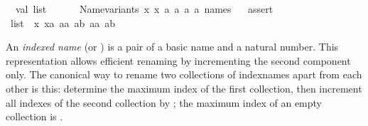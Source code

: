 \begin{isabellebody}
\isanewline
\ \ val\ list{}\ {}\isanewline
\ \ \ \ {}{}\ {}Name{}variants\ {}{}x{}{}\ {}x{}{}\ {}a{}{}\ {}a{}{}\ {}{}a{}{}\ {}{}a{}{}\ names{}{}\isanewline
\ \ %
\isaantiq
assert{}%
\endisaantiq
\ {}list{}\ {}\ {}{}x{}{}\ {}xa{}{}\ {}aa{}{}\ {}ab{}{}\ {}{}aa{}{}\ {}{}ab{}{}{}{}\isanewline
{}%
\endisatagML
{\isafoldML}%
%
\isadelimML
\isanewline
%
\endisadelimML
\isanewline
{}\isamarkupfalse%
%
\isamarkuptrue%
%
\begin{isamarkuptext}%
An \emph{indexed name} (or ) is a pair of a basic
  name and a natural number.  This representation allows efficient
  renaming by incrementing the second component only.  The canonical
  way to rename two collections of indexnames apart from each other is
  this: determine the maximum index  of the first
  collection, then increment all indexes of the second collection by
  ; the maximum index of an empty collection is
  .


\end{isamarkuptext}
\end{isabellebody}
